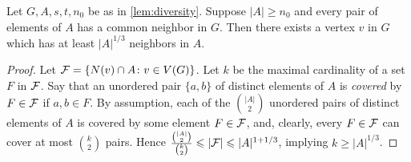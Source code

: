 \begin{corollary}\label{cor:diversity}
  Let $G,A,s,t,n_0$ be as in \cref{lem:diversity}.
  Suppose $|A|\ge n_0$ and every pair of elements of $A$ has a common neighbor in $G$.
  Then there exists a vertex $v$ in $G$ which has at least $|A|^{1/3}$ neighbors in $A$.
\end{corollary}
\begin{proof}Let ${\cal F}=\set{N(v)\cap A\colon v\in V(G)}$. 
  Let $k$ be the maximal cardinality of a set $F$ in ${\cal F}$.
  Say that an unordered pair $\{a,b\}$ of distinct elements of $A$ is \emph{covered} by $F\in {\cal F}$
  if  $a,b\in F$.
  By assumption, each of the $\binom{|A|}{2}$ unordered pairs of distinct elements of $A$ is covered by some element $F\in {\cal F}$, and,
  clearly, every $F\in {\cal F}$ can cover at most $\binom{k}{2}$ pairs. 
  Hence $\frac{\binom{|A|}{2}}{\binom{k}{2}}\leq |{\cal F}|\le  |A|^{1+1/3}$, implying $k\ge |A|^{1/3}$.
\end{proof}

\begin{comment}
\begin{corollary}\label{cor:biversity}
    For every positive real $\alpha<\frac 1 2$ and integer $t\in\N$ there exists an integer $\ell_0$ with the following property.
  Let $G$ be a graph such that $K_t\not\minor_2 G$
  and let
  $A$ be a $1$-independent subset of $G$ with $|A|\ge \ell_0$ such that every pair of vertices in $A$ has a common neighbor in $G$.
   Then there is a vertex $v\in G$
  with at least $|A|^{\alpha}$ neighbors in $A$.
\end{corollary}
\begin{proof}\label{pf:}
  Define $H$ to be the bipartite graph induced 
  by $G$, with partite sets $A$ and $V(G)-A$; that is,  $v\in A$ and $w\in V(G)-A$ are adjacent in $H$ iff they are in $G$. 
  We claim that $K_{2t^2}\not\minor_1 H$. Indeed, it is easy to see that 
  since $H$ is bipartite, $K_{2t^2}\minor_1 H$ would imply that $H$ contains the 
  complete bipartite graph $K_{t^2,t^2}$,  which, in turn, implying that $K_{t}\minor_2 G$, contrary to our assumption.  
  
  Let $\ell_0$
    be the value $n_0$ from~\cref{lem:diversity} applied to $2t^2$ in place of $t$ and $\epsilon$ such that $(1-\epsilon)/2=\alpha$. Applying~\cref{cor:diversity} to $H,2t,\epsilon,\ell_0$, we conclude that if every pair of elements of $A$ has a common neighbor in $G$
    (hence also in $H$), then there is a vertex $v$
    of $H$ with at least $|A|^{\alpha}$ neighbors in~$A$.
\end{proof}
\end{comment}

